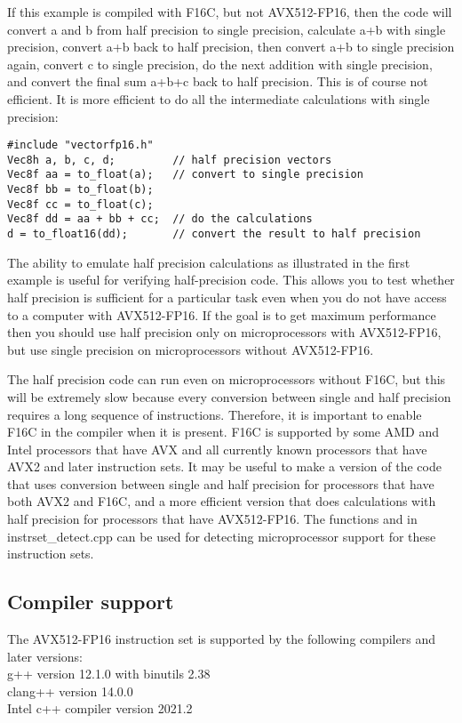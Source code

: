 \documentclass[vcl_manual.tex]{subfiles}
\begin{document}
If this example is compiled with F16C, but not AVX512-FP16, then the code will convert a and b from half precision to single precision, calculate a+b with single precision, convert a+b back to half precision, then convert a+b to single precision again, convert c to single precision, do the next addition with single precision, and convert the final sum a+b+c back to half precision. This is of course not efficient. It is more efficient to do all the intermediate calculations with single precision:

\begin{lstlisting}[frame=single]
#include "vectorfp16.h"
Vec8h a, b, c, d;         // half precision vectors
Vec8f aa = to_float(a);   // convert to single precision
Vec8f bb = to_float(b);
Vec8f cc = to_float(c);
Vec8f dd = aa + bb + cc;  // do the calculations
d = to_float16(dd);       // convert the result to half precision
\end{lstlisting}

The ability to emulate half precision calculations as illustrated in the first example is useful for verifying half-precision code. This allows you to test whether half precision is sufficient for a particular task even when you do not have access to a computer with AVX512-FP16. If the goal is to get maximum performance then you should use half precision only on microprocessors with AVX512-FP16, but use single precision on microprocessors without AVX512-FP16.

The half precision code can run even on microprocessors without F16C, but this will be extremely slow because every conversion between single and half precision requires a long sequence of instructions. Therefore, it is important to enable F16C in the compiler when it is present. F16C is supported by some AMD and Intel processors that have AVX and all currently known processors that have AVX2 and later instruction sets. It may be useful to make a version of the code that uses conversion between single and half precision for processors that have both AVX2 and F16C, and a more efficient version that does calculations with half precision for processors that have AVX512-FP16. The functions  and  in instrset\_detect.cpp can be used for detecting microprocessor support for these instruction sets.

\subsection{Compiler support}
The AVX512-FP16 instruction set is supported by the following compilers and later versions:\\
g++ version 12.1.0 with binutils 2.38 \\
clang++ version 14.0.0 \\
Intel c++ compiler version 2021.2
\end{document}
